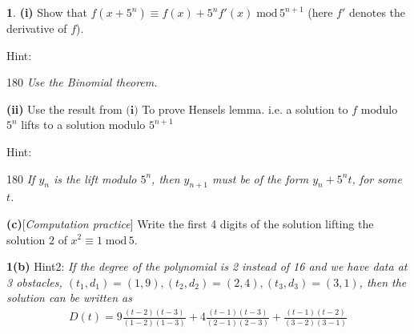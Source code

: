 \documentclass[11pt]{article}
\theoremstyle{definition}
\newtheorem{pb}{}
\begin{document}
\begin{pb}
    \textbf{(i)} Show that \(f(x + 5^n) \equiv f(x) + 5^nf'(x) \;\text{mod}\,5^{n+1}\) (here \(f'\) denotes the derivative of \(f\)).

    \vspace{0.1cm}
    Hint: \begin{rotate}{180}
        \hspace{-4.5cm} \emph{Use the Binomial theorem.}
    \end{rotate}
    \vspace{0.1cm}

    \textbf{(ii)} Use the result from \(\textbf{(i)}\) To prove Hensels lemma. i.e. a solution to \(f\) modulo \(5^n\) lifts to a solution modulo \(5^{n+1}\)

    \vspace{0.1cm}
    Hint: \begin{rotate}{180}
        \hspace{-13.3cm} \emph{If \(y_n\) is the lift modulo \(5^n\), then \(y_{n+1}\) must be of the form \(y_n + 5^nt\), for some \(t\).}
    \end{rotate}
    \vspace{0.1cm}

    \textbf{(c)}[\emph{Computation practice}] Write the first 4 digits of the solution lifting the solution \(2\) of \(x^2 \equiv 1 \;\text{mod}\,5\).
\end{pb}

\vspace{5cm}

\textbf{1(b)} Hint2: \emph{If the degree of the polynomial is 2 instead of 16 and we have data at 3 obstacles, \((t_1,d_1) = (1,9),(t_2,d_2) = (2,4),(t_3,d_3) = (3,1)\), then the solution can be written as}
    \begin{align*}
        D(t) = 9\frac{(t-2)(t-3)}{(1-2)(1-3)} + 4\frac{(t-1)(t-3)}{(2-1)(2-3)} + \frac{(t-1)(t-2)}{(3-2)(3-1)}
    \end{align*}
    \vspace{0.1cm}
\end{document}
